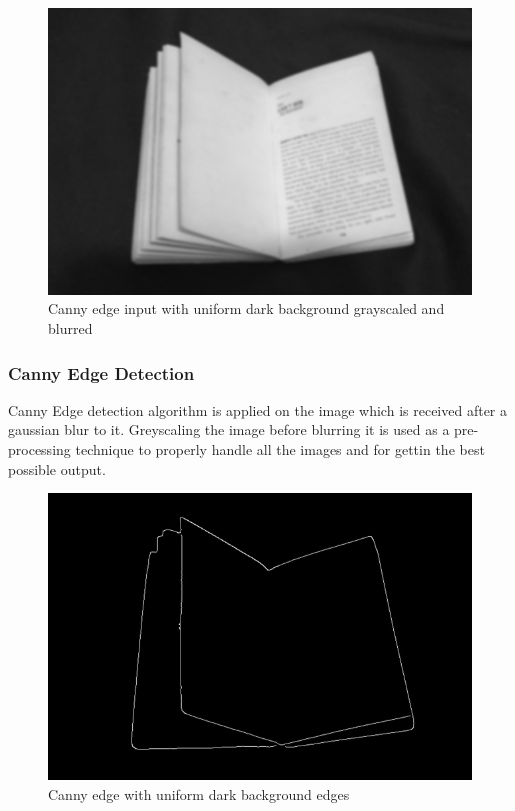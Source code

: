 \documentclass[BTech]{srmuthesis}
\begin{document}
\begin{figure}[h!]
    \centering
    \includegraphics[width=15cm\textwidth]{win_frnds_blue_grayed_640_480}
    \caption{Canny edge input with uniform dark background grayscaled and blurred}
    \label{fig:Canny edge input with uniform background grayscaled}
\end{figure}

\newpage

\subsubsection{Canny Edge Detection}

Canny Edge detection algorithm is applied on the image which is received after a gaussian blur to it. Greyscaling the image before blurring it is used as a pre-processing technique to properly handle all the images and for gettin the best possible output.

\begin{figure}[h!]
    \centering
    \includegraphics[width=15cm\textwidth]{win_frnds_blue_canny_640x480}
    \caption{Canny edge with uniform dark background edges}
    \label{fig:Canny edge input with uniform background edges}
\end{figure}
\end{document}
